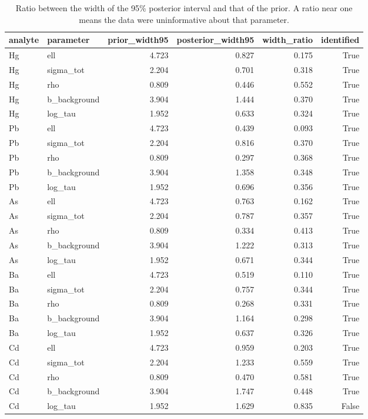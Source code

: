 \begin{table}[htbp]
\centering
\caption{Ratio between the width of the 95\% posterior interval and that of the prior. A ratio near one means the data were uninformative about that parameter.}
\label{tab:priorpost}
\footnotesize
\begin{tabular}{llrrrr}
\toprule
analyte & parameter & prior\_width95 & posterior\_width95 & width\_ratio & identified \\
\midrule
Hg & ell & 4.723 & 0.827 & 0.175 & True \\
Hg & sigma\_tot & 2.204 & 0.701 & 0.318 & True \\
Hg & rho & 0.809 & 0.446 & 0.552 & True \\
Hg & b\_background & 3.904 & 1.444 & 0.370 & True \\
Hg & log\_tau & 1.952 & 0.633 & 0.324 & True \\
Pb & ell & 4.723 & 0.439 & 0.093 & True \\
Pb & sigma\_tot & 2.204 & 0.816 & 0.370 & True \\
Pb & rho & 0.809 & 0.297 & 0.368 & True \\
Pb & b\_background & 3.904 & 1.358 & 0.348 & True \\
Pb & log\_tau & 1.952 & 0.696 & 0.356 & True \\
As & ell & 4.723 & 0.763 & 0.162 & True \\
As & sigma\_tot & 2.204 & 0.787 & 0.357 & True \\
As & rho & 0.809 & 0.334 & 0.413 & True \\
As & b\_background & 3.904 & 1.222 & 0.313 & True \\
As & log\_tau & 1.952 & 0.671 & 0.344 & True \\
Ba & ell & 4.723 & 0.519 & 0.110 & True \\
Ba & sigma\_tot & 2.204 & 0.757 & 0.344 & True \\
Ba & rho & 0.809 & 0.268 & 0.331 & True \\
Ba & b\_background & 3.904 & 1.164 & 0.298 & True \\
Ba & log\_tau & 1.952 & 0.637 & 0.326 & True \\
Cd & ell & 4.723 & 0.959 & 0.203 & True \\
Cd & sigma\_tot & 2.204 & 1.233 & 0.559 & True \\
Cd & rho & 0.809 & 0.470 & 0.581 & True \\
Cd & b\_background & 3.904 & 1.747 & 0.448 & True \\
Cd & log\_tau & 1.952 & 1.629 & 0.835 & False \\
\bottomrule
\end{tabular}
\end{table}
